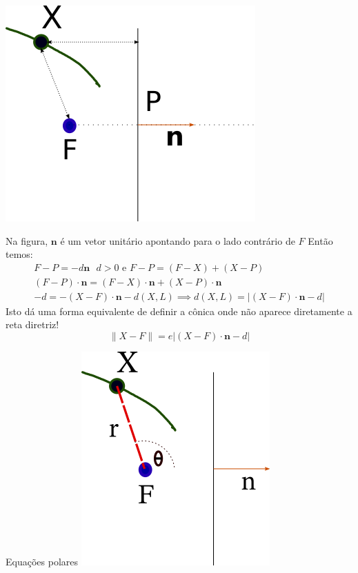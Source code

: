 \documentclass{beamer}
\begin{document}
\begin{frame}

  \includegraphics{conica1.png}
\end{frame}

\begin{frame}
Na figura, $\mathbf{n}$ é um vetor unitário apontando para o lado contrário de $F$
Então temos:
\begin{gather*}
  F-P = -d\mathbf{n} \text{ } d>0 \text{ e } F-P = (F-X) + (X-P) \\
  (F-P)\cdot \mathbf{n}= (F-X)\cdot \mathbf{n} + (X-P)\cdot \mathbf{n}\\
  -d = -(X-F)\cdot\mathbf{n} -d(X,L) \implies d(X,L)=|(X-F)\cdot\mathbf{n}-d|
  \end{gather*}
  Isto dá uma forma equivalente de definir a cônica onde não aparece diretamente a reta 
  diretriz!
  $$\|X-F\| = e |(X-F)\cdot\mathbf{n}-d|$$
\end{frame}

    \begin{frame}{Equações polares }
     \includegraphics{conica2.png}
    \end{frame}
   
\end{document}
